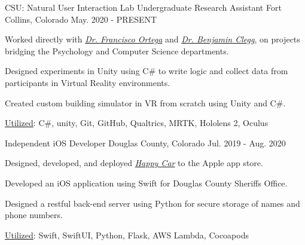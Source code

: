 

\begin{cventries}

  \cventry
    {CSU: Natural User Interaction Lab} %
    {Undergraduate Research Assistant} %
    {Fort Collins, Colorado} %
    {May. 2020 - PRESENT} %
    {
      \begin{cvitems} %
        \item {Worked directly with \textit{\href{https://compsci.colostate.edu/person/?id=22550A7530193FD205613DD09DD2EE6F&sq=t}{Dr. Francisco Ortega}} and \textit{\href{http://psywebserv.psych.colostate.edu/psylist/detail.asp?Num=15}{Dr. Benjamin Clegg}}, on projects bridging the Psychology and Computer Science departments.}
        \item {Designed experiments in Unity using C\# to write logic and collect data from participants in Virtual Reality environments.}
        \item {Created custom building simulator in VR from scratch using Unity and C\#.}
        \item {\underline{Utilized}:  C\#, unity,  Git,  GitHub,  Qualtrics, MRTK, Hololens 2, Oculus}
      \end{cvitems}
    }

  \cventry
    {Independent} %
    {iOS Developer} %
    {Douglas County, Colorado} %
    {Jul. 2019 - Aug. 2020} %
    {
      \begin{cvitems} %
        \item {Designed, developed, and deployed \textit{\href{https://apps.apple.com/us/app/happy-car-app/id1567999750,}{Happy Car}} to the Apple app store.}
        \item {Developed an iOS  application using Swift for Douglas County Sheriffs Office.}
        \item {Designed a restful  back-end server using Python for secure storage of names and phone numbers.}
        \item {\underline{Utilized}:  Swift, SwiftUI,  Python, Flask, AWS Lambda, Cocoapods}
      \end{cvitems}
    }


\end{cventries}
